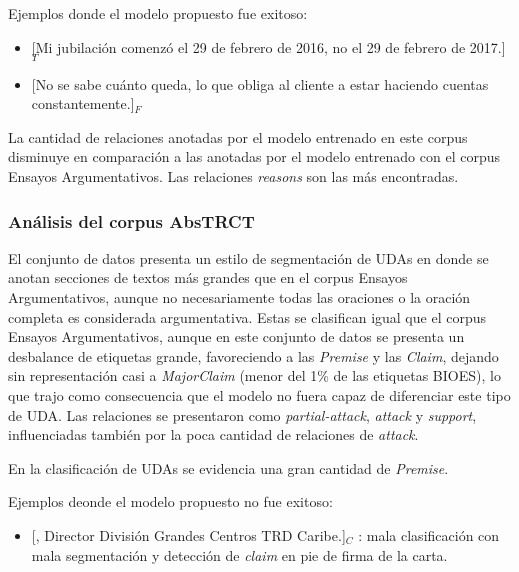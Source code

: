 \documentclass{rcci} %
\begin{document}
Ejemplos donde el modelo propuesto fue exitoso:
\begin{itemize}
	\item \text{} [Mi jubilaci\'on comenz\'o el 29 de febrero de 2016, no el 29 de febrero de 2017.]$_T$ %
	\item \text{} [No se sabe cu\'anto queda, lo que obliga al cliente a estar haciendo cuentas constantemente.]$_F$ %
\end{itemize}

La cantidad de relaciones anotadas por el modelo entrenado en este corpus
disminuye en comparaci\'on a las anotadas por el modelo entrenado con el corpus Ensayos
Argumentativos. Las relaciones \textit{reasons} son las m\'as encontradas. %

\subsubsection*{An\'alisis del corpus AbsTRCT}

El conjunto de datos presenta un estilo de segmentaci\'on de UDAs en donde se anotan 
secciones de textos m\'as grandes que en el corpus Ensayos Argumentativos, aunque no necesariamente 
todas las oraciones o la oraci\'on completa es considerada argumentativa. 
Estas se clasifican igual que el corpus Ensayos Argumentativos, aunque 
en este conjunto de datos se presenta un desbalance de etiquetas grande, favoreciendo 
a las \textit{Premise} y las \textit{Claim}, %
dejando sin representaci\'on casi a \textit{MajorClaim}
(menor del 1\% de las etiquetas BIOES), lo que trajo como consecuencia que el modelo no fuera 
capaz de diferenciar este tipo de UDA. Las relaciones se presentaron como \textit{partial-attack},
\textit{attack} y \textit{support}, influenciadas tambi\'en por la poca cantidad de relaciones de \textit{attack}.

En la clasificaci\'on de UDAs se evidencia una gran cantidad de \textit{Premise}.

Ejemplos deonde el modelo propuesto no fue exitoso:
\begin{itemize}
	\item \text{} [, Director Divisi\'on Grandes Centros TRD Caribe.]$_C$
	      : mala clasificaci\'on con mala segmentaci\'on y detecci\'on de \textit{claim} en pie de firma de la carta. 
\end{itemize}
\end{document}
